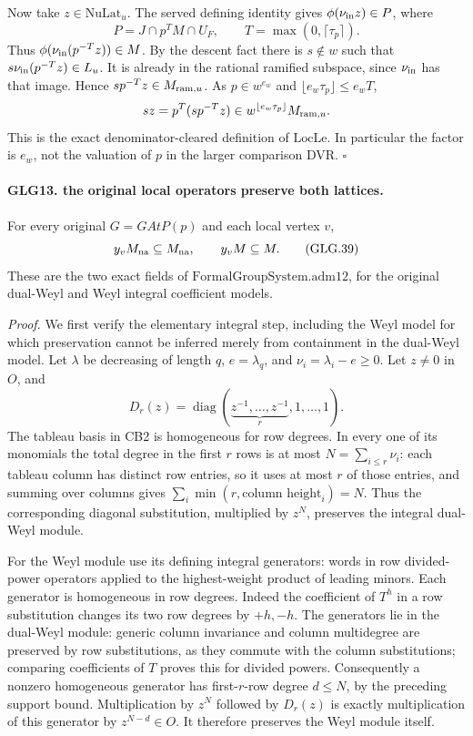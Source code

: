 \documentclass[11pt,a4paper]{article}
\numberwithin{equation}{section}
\theoremstyle{remark}\newtheorem{remark}[theorem]{Remark}
\begin{document}
Now take \(z\in\mathrm{NuLat}_u\).
The served defining identity gives
\(\phi(\nu_{\rm in}z)\in P\), where
\[
                  P=J\cap p^T M\cap U_F,\qquad
                  T=\max(0,\lceil\tau_p\rceil).
 \]
Thus \(\phi(\nu_{\rm in}(p^{-T}z))\in M\).
By the descent fact there is \(s\notin w\) such that
\(s\nu_{\rm in}(p^{-T}z)\in L_u\). It is already in the
rational ramified subspace, since \(\nu_{\rm in}\) has
that image. Hence \(sp^{-T}z\in M_{{\rm ram},u}\).
As \(p\in w^{e_w}\) and
\(\lfloor e_w\tau_p\rfloor\le e_wT\),
\[
          sz=p^T(sp^{-T}z)
                     \in w^{\lfloor e_w\tau_p\rfloor}
                                          M_{{\rm ram},u}.
 \]
This is the exact denominator-cleared definition of
\(\mathrm{LocLe}\). In particular the factor is \(e_w\),
not the valuation of \(p\) in the larger comparison DVR.
\hfill\(\square\)

\paragraph{GLG13. the original local operators preserve both lattices.}
\label{claim:GLG13}
For every original \(G=GAtP(p)\) and each local vertex \(v\),
\[
                        y_vM_{\rm na}\subseteq M_{\rm na},
                  \qquad y_vM\subseteq M .                        \tag{GLG.39}
\]
These are the two exact fields of
\(\mathrm{FormalGroupSystem.adm12}\), for the original
dual-Weyl and Weyl integral coefficient models.

\emph{Proof.}
We first verify the elementary integral step, including the
Weyl model for which preservation cannot be inferred merely
from containment in the dual-Weyl model. Let \(\lambda\) be
decreasing of length \(q\), \(e=\lambda_q\), and
\(\nu_i=\lambda_i-e\ge0\). Let \(z\ne0\) in \(O\), and
\[
                 D_r(z)=\operatorname{diag}
                         (\underbrace{z^{-1},\ldots,z^{-1}}_r,
                                           1,\ldots,1).
 \]
The tableau basis in CB2 is homogeneous for row degrees.
In every one of its monomials the total degree in the
first \(r\) rows is at most \(N=\sum_{i\le r}\nu_i\):
each tableau column has distinct row entries, so it uses
at most \(r\) of those entries, and summing over columns
gives \(\sum_i\min(r,\text{column height}_i)=N\).
Thus the corresponding diagonal substitution, multiplied
by \(z^N\), preserves the integral dual-Weyl module.

For the Weyl module use its defining integral generators:
words in row divided-power operators applied to the
highest-weight product of leading minors. Each generator
is homogeneous in row degrees. Indeed the coefficient
of \(T^h\) in a row substitution changes its two row
degrees by \(+h,-h\). The generators lie in the dual-Weyl
module: generic column invariance and column multidegree
are preserved by row substitutions, as they commute
with the column substitutions; comparing coefficients
of \(T\) proves this for divided powers. Consequently a
nonzero homogeneous generator has first-\(r\)-row degree
\(d\le N\), by the preceding support bound. Multiplication
by \(z^N\) followed by \(D_r(z)\) is exactly multiplication
of this generator by \(z^{N-d}\in O\). It therefore
preserves the Weyl module itself.
\end{document}
